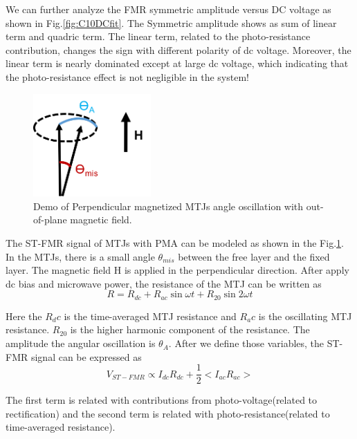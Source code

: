 We can further analyze the FMR symmetric amplitude versus DC voltage as shown in Fig.\ref{fig:C10DCfit}. The Symmetric amplitude shows as sum of linear term and quadric term. The linear term, related to the photo-resistance contribution, changes the sign with different polarity of dc voltage. Moreover, the linear term is nearly dominated except at large dc voltage, which indicating that the photo-resistance effect is not negligible in the system!

\begin{figure}[!ht]
  \centering
  \includegraphics[width=0.4\textwidth]{fig/2018/demo}
   \caption{Demo of Perpendicular magnetized MTJs angle oscillation with out-of-plane magnetic field.}
  \label{fig:demo}
\end{figure}

The ST-FMR signal of MTJs with PMA can be modeled as shown in the Fig.\ref{fig:demo}. In the MTJs, there is a small angle $\theta_{mis}$ between the free layer and the fixed layer. The magnetic field H is applied in the perpendicular direction. After apply dc bias and microwave power, the resistance of the MTJ can be written as 
	\begin{equation}
		R = R_{dc} + R_{ac} \sin{\omega t} + R_{20} \sin{2 \omega t} 
	\end{equation}
	
Here the $R_dc$ is the time-averaged MTJ resistance and $R_ac$ is the oscillating MTJ resistance. $R_{20}$ is the higher harmonic component of the resistance. The amplitude the angular oscillation is $\theta_A$. After we define those variables, the ST-FMR signal can be expressed as 
\begin{equation}
	V_{ST-FMR} \propto I_{dc}R_{dc} + \frac{1}{2} <I_{ac}R_{ac}>
\end{equation}

The first term is related with contributions from photo-voltage(related to rectification) and the second term is related with photo-resistance(related to time-averaged resistance).


